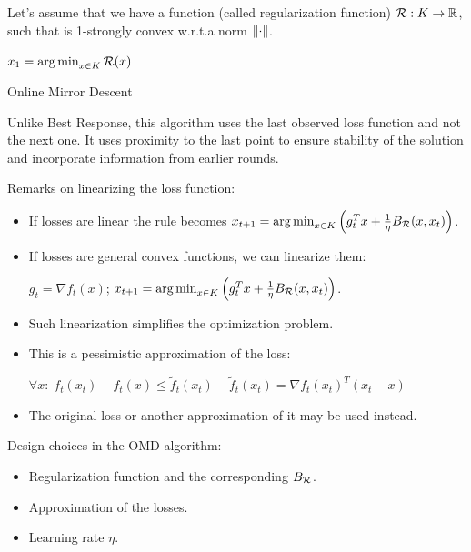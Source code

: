 \documentclass[11pt]{article}
\theoremstyle{definition}
\theoremstyle{definition}
\newcommand{\pth}[1]{\left( #1\right)}                 %
\newcommand{\brk}[1]{\left[ #1\right]}                 %
\newcommand{\wrt}{w.r.t.}
\newcommand{\strongcvx}[1]{#1-strongly convex}
\newcommand{\Kset}{\ensuremath{K}}
\begin{document}
Let's assume that we have a function (called regularization function) $ \R : \Kset \to \reals $, such that \R{} is \strongcvx{1} \wrt a norm $\mathopen\| \cdot \mathclose\|$.

\begin{algorithm}[H]
\SetAlgoLined
\KwParam{ $ \R : \Kset \to \reals $ , $ \eta > 0 $ }
$ x_1 = \argmin_{x \in \Kset} \R(x) $
\;
 \For{$t \in \brk{T}$}{
  $ x_{t+1} = \argmin_{x \in \Kset} \pth{ f_t(x) + \frac{1}{\eta} B_\R(x, x_t) } $\;
 }
 \caption{Online Mirror Descent}
\end{algorithm}

Unlike Best Response, this algorithm uses the last observed loss function and not the next one. It uses proximity to the last point to ensure stability of the solution and incorporate information from earlier rounds.

Remarks on linearizing the loss function:
\begin{itemize}
\item If losses are linear the rule becomes $ x_{t+1} = \argmin_{x \in \Kset} \pth{ g_t^T x + \frac{1}{\eta} B_\R(x, x_t) } $.

\item If losses are general convex functions, we can linearize them:

$ g_t = \nabla f_t(x) $; \quad
$ x_{t+1} = \argmin_{x \in \Kset} \pth{ g_t^T x + \frac{1}{\eta} B_\R(x, x_t) } $.

\item Such linearization simplifies the optimization problem.

\item This is a pessimistic approximation of the loss:

$ \forall x: \; f_t(x_t) - f_t(x) \leq \tilde{f}_t(x_t) - \tilde{f}_t(x_t) = \nabla f_t(x_t)^T (x_t - x)$

\item The original loss or another approximation of it may be used instead.

\end{itemize}

Design choices in the OMD algorithm:
\begin{itemize}
\item Regularization function \R{} and the corresponding $ B_{\mathcal R}$.
\item Approximation of the losses.
\item Learning rate $\eta$.
\end{itemize}
\end{document}

